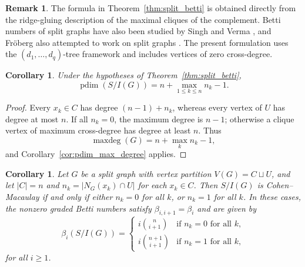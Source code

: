 \documentclass[12pt, reqno]{amsart}
\newtheorem{corollary}[theorem]{Corollary}
\theoremstyle{definition}
\newtheorem{remark}[theorem]{Remark}
\numberwithin{equation}{section}
\begin{document}
\begin{remark}\label{rem:split-literature}
	The formula in Theorem~\ref{thm:split_betti} is obtained directly from the ridge-gluing description of the maximal cliques of the complement.  Betti numbers of split graphs have also been studied by Singh and Verma \cite{singh2020}, and Fr\"oberg also attempted to work on split graphs \cite{froeberg2026}.  The present formulation uses the $(d_1,\ldots,d_q)$-tree framework and includes vertices of zero cross-degree.
\end{remark}
	
	\begin{corollary}\label{cor:split_pdim}
Under the hypotheses of Theorem~\ref{thm:split_betti},
\[
\operatorname{pdim}(S/I(G))
=n+\max_{1\le k\le n}n_k-1.
\]
\end{corollary}
\begin{proof}
Every $x_k\in C$ has degree $(n-1)+n_k$, whereas every vertex of $U$ has degree at most $n$.  If all $n_k=0$, the maximum degree is $n-1$; otherwise a clique vertex of maximum cross-degree has degree at least $n$.  Thus
\[
\operatorname{maxdeg}(G)=n+\max_k n_k-1,
\]
and Corollary~\ref{cor:pdim_max_degree} applies.
\end{proof}
	
	\begin{corollary}\label{cor:cm_split}
		Let $G$ be a split graph with vertex partition $V(G)=C \sqcup U$, and let $|C|=n$ and $n_k= |N_G(x_k)\cap U|$ for each $x_k \in C$.
		Then $S/I(G)$ is Cohen--Macaulay if and only if either $n_k=0$ for all $k$, or $n_k=1$ for all $k$. In these cases, the nonzero graded Betti numbers satisfy $\beta_{i,i+1}=\beta_i$ and are given by
		\[
		\beta_i(S/I(G)) = 
		\begin{cases}
			i\binom{n}{i+1} & \text{if } n_k=0 \text{ for all } k, \\[6pt]
			i\binom{n+1}{i+1} & \text{if } n_k=1 \text{ for all } k,
		\end{cases}
		\]
		for all $i\ge1$.
	\end{corollary}
	
\end{document}
